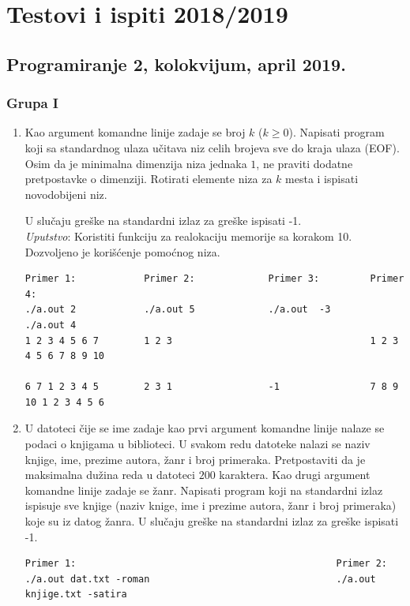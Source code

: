 \chapter{Testovi i ispiti 2018/2019}

\section{Programiranje 2, kolokvijum, april 2019.}
\subsection{Grupa I}

\begin{enumerate}
\item Kao argument komandne linije zadaje se broj $k$ ($k \ge 0$).  Napisati program koji sa
standardnog ulaza učitava niz celih brojeva sve do kraja ulaza (EOF). Osim da
je minimalna dimenzija niza jednaka $1$, ne praviti dodatne pretpostavke o
dimenziji. Rotirati elemente niza za $k$ mesta i ispisati novodobijeni niz.

U slučaju greške na standardni izlaz za greške ispisati -1. \\
\emph{Uputstvo}: Koristiti funkciju za realokaciju memorije sa korakom 10. Dozvoljeno je korišćenje pomoćnog niza.
\begin{verbatim}
Primer 1:            Primer 2:             Primer 3:         Primer 4:
./a.out 2            ./a.out 5             ./a.out  -3       ./a.out 4 
1 2 3 4 5 6 7        1 2 3                                   1 2 3 4 5 6 7 8 9 10

6 7 1 2 3 4 5        2 3 1                 -1                7 8 9 10 1 2 3 4 5 6
\end{verbatim}


\item U datoteci čije se ime zadaje kao prvi argument komandne linije nalaze se
podaci o knjigama u biblioteci. U svakom redu datoteke nalazi se naziv knjige,
ime, prezime autora, žanr i broj primeraka. Pretpostaviti da je maksimalna
dužina reda u datoteci $200$ karaktera. Kao drugi argument komandne linije
zadaje se žanr. Napisati program koji na standardni izlaz ispisuje sve knjige
(naziv knige, ime i prezime autora, žanr i broj primeraka) koje su iz datog
žanra. U slučaju greške na standardni izlaz za greške ispisati -1.
\begin{verbatim}
Primer 1:                                              Primer 2:
./a.out dat.txt -roman                                 ./a.out knjige.txt -satira


\end{verbatim}
\end{enumerate}
